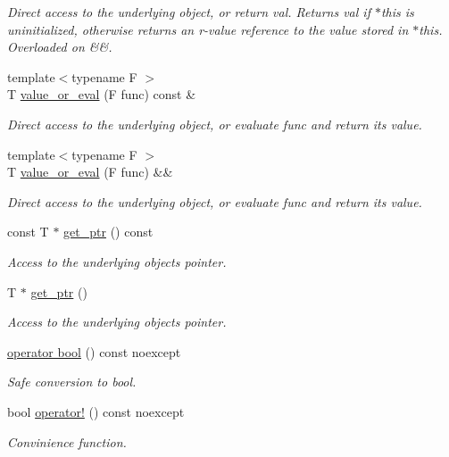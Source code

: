 \begin{DoxyCompactItemize}
\begin{DoxyCompactList}\small\item\em Direct access to the underlying object, or return {\ttfamily val}. Returns {\ttfamily val} if $\ast$this is uninitialized, otherwise returns an r-\/value reference to the value stored in $\ast$this. Overloaded on \&\&. \end{DoxyCompactList}\item 
{\footnotesize template$<$typename F $>$ }\\T \hyperlink{classmcurses_1_1Optional_aa5a4cbc8fd315e360e6fcb6dc4e55c07}{value\+\_\+or\+\_\+eval} (F func) const \&
\begin{DoxyCompactList}\small\item\em Direct access to the underlying object, or evaluate {\ttfamily func} and return its value. \end{DoxyCompactList}\item 
{\footnotesize template$<$typename F $>$ }\\T \hyperlink{classmcurses_1_1Optional_ab90365e7ea0a567427f174085931caa4}{value\+\_\+or\+\_\+eval} (F func) \&\&
\begin{DoxyCompactList}\small\item\em Direct access to the underlying object, or evaluate {\ttfamily func} and return its value. \end{DoxyCompactList}\item 
const T $\ast$ \hyperlink{classmcurses_1_1Optional_ac1c01b2ccf9aa96c1e5f91d78bdbc928}{get\+\_\+ptr} () const
\begin{DoxyCompactList}\small\item\em Access to the underlying object\textquotesingle{}s pointer. \end{DoxyCompactList}\item 
T $\ast$ \hyperlink{classmcurses_1_1Optional_a7f9c56ad08329b814a314d741e92fa59}{get\+\_\+ptr} ()
\begin{DoxyCompactList}\small\item\em Access to the underlying object\textquotesingle{}s pointer. \end{DoxyCompactList}\item 
\hyperlink{classmcurses_1_1Optional_ae9ac980d14dea230fdf8e1fbb3501eb4}{operator bool} () const noexcept
\begin{DoxyCompactList}\small\item\em Safe conversion to bool. \end{DoxyCompactList}\item 
bool \hyperlink{classmcurses_1_1Optional_a4d864144db0c48ea381b6582214f256b}{operator!} () const noexcept
\begin{DoxyCompactList}\small\item\em Convinience function. \end{DoxyCompactList}\end{DoxyCompactItemize}
